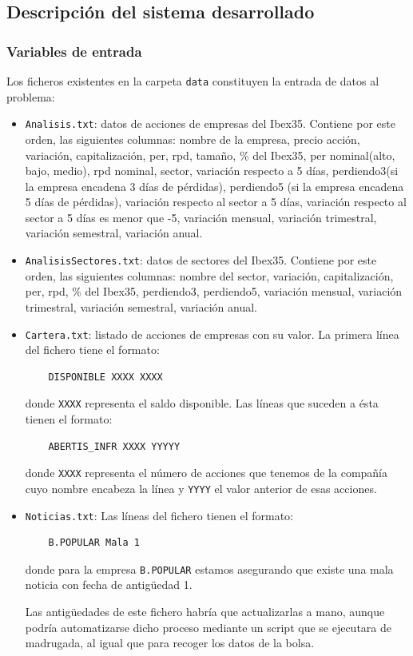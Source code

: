 \documentclass[a4paper,11pt]{article}
\begin{document}
\subsection{Descripción del sistema desarrollado}
\subsubsection{Variables de entrada}
Los ficheros existentes en la carpeta \texttt{data} constituyen la entrada de datos al problema:

\begin{itemize}
 \item \texttt{Analisis.txt}: datos de acciones de empresas del Ibex35. Contiene por este orden, las siguientes columnas:
 nombre de la empresa, precio acción, variación, capitalización, per, rpd, tamaño, \% del Ibex35, per nominal(alto, bajo, medio), rpd nominal,
 sector, variación respecto a 5 días, perdiendo3(si la empresa encadena 3 días de pérdidas), perdiendo5 (si la empresa encadena
 5 días de pérdidas), variación respecto al sector a 5 días, variación respecto al sector a 5 días es menor que -5, variación
 mensual, variación trimestral, variación semestral, variación anual.
 \item \texttt{AnalisisSectores.txt}: datos de sectores del Ibex35. Contiene por este orden, las siguientes columnas:
 nombre del sector, variación, capitalización, per, rpd, \% del Ibex35, perdiendo3, perdiendo5, variación mensual, variación
 trimestral, variación semestral, variación anual.
 \item \texttt{Cartera.txt}: listado de acciones de empresas con su valor.
  La primera línea del fichero tiene el formato:
  \begin{verbatim}
    DISPONIBLE XXXX XXXX
  \end{verbatim}
  
  donde \texttt{XXXX} representa el saldo disponible.
  Las líneas que suceden a ésta tienen el formato:
  
  \begin{verbatim}
    ABERTIS_INFR XXXX YYYYY
  \end{verbatim}

  donde \texttt{XXXX} representa el número de acciones que tenemos de la compañía cuyo nombre encabeza la línea
  y \texttt{YYYY} el valor anterior de esas acciones.
  
 \item \texttt{Noticias.txt}: Las líneas del fichero tienen el formato:
  
  \begin{verbatim}
    B.POPULAR Mala 1
  \end{verbatim} 
 
  donde para la empresa \texttt{B.POPULAR} estamos asegurando que existe una mala noticia con fecha de antig\"uedad 1.
  
  Las antig\"uedades de este fichero habría que actualizarlas a mano, aunque podría automatizarse dicho proceso mediante un
  script que se ejecutara de madrugada, al igual que para recoger los datos de la bolsa.
\end{itemize}
\end{document}
